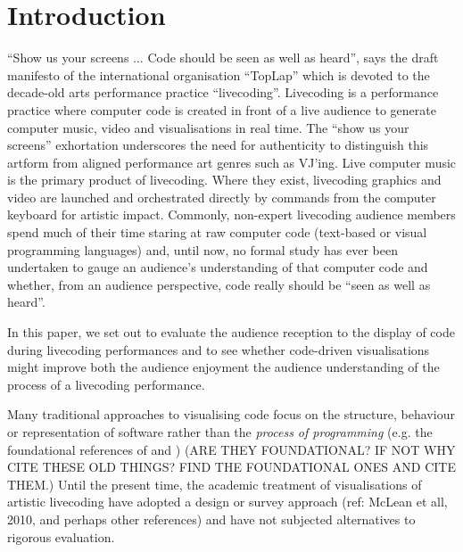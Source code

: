 \documentclass{sig-alternate}
\begin{document}



\section{Introduction}

``Show us your screens ... Code should be seen as well as heard'', says the draft manifesto of the international organisation ``TopLap'' \cite{Toplap} which is devoted to the decade-old arts performance practice ``livecoding''. Livecoding is a performance practice where computer code is created in front of a live audience to generate computer music, video and visualisations in real time. The ``show us your screens'' exhortation underscores the need for authenticity to distinguish this artform from aligned performance art genres such as VJ'ing. Live computer music is the primary product of livecoding. Where they exist, livecoding graphics and video are launched and orchestrated directly by commands from the computer keyboard for artistic impact. Commonly, non-expert livecoding audience members spend much of their time staring at raw computer code (text-based or visual programming languages) and, until now, no formal study has ever been undertaken to gauge an audience's understanding of that computer code and whether, from an audience perspective, code really should be ``seen as well as heard''. 

In this paper, we set out to evaluate the audience reception to the display of code during livecoding performances and to see whether code-driven visualisations  might improve both the audience enjoyment the audience understanding of the process of a livecoding performance.

Many traditional approaches to visualising code focus on the structure, behaviour or representation of software rather than the {\it process of programming} (e.g. the foundational references of \cite{Ball1996} and \cite{Price1992}) (ARE THEY FOUNDATIONAL? IF NOT WHY CITE THESE OLD THINGS? FIND THE FOUNDATIONAL ONES AND CITE THEM.) Until the present time, the academic treatment of visualisations of artistic livecoding have adopted a design or survey approach (ref: McLean et all, 2010, and perhaps other references) and have not subjected alternatives to rigorous evaluation.

\end{document}
